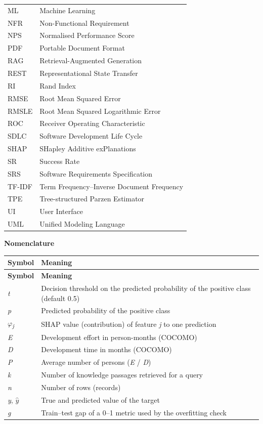 \begin{longtable}{@{}p{1.5in}p{\dimexpr\linewidth-1.5in-2\tabcolsep\relax}@{}}
ML & Machine Learning \\
NFR & Non-Functional Requirement \\
NPS & Normalised Performance Score \\
PDF & Portable Document Format \\
RAG & Retrieval-Augmented Generation \\
REST & Representational State Transfer \\
RI & Rand Index \\
RMSE & Root Mean Squared Error \\
RMSLE & Root Mean Squared Logarithmic Error \\
ROC & Receiver Operating Characteristic \\
SDLC & Software Development Life Cycle \\
SHAP & SHapley Additive exPlanations \\
SR & Success Rate \\
SRS & Software Requirements Specification \\
TF-IDF & Term Frequency--Inverse Document Frequency \\
TPE & Tree-structured Parzen Estimator \\
UI & User Interface \\
UML & Unified Modeling Language \\
\end{longtable}
\endgroup
\vspace{24pt}
{\centering\normalfont\bfseries\fontsize{20}{24}\selectfont Nomenclature\par}
\vspace{18pt}
\begingroup
\linespread{1}\selectfont\renewcommand{\arraystretch}{1.25}
\begin{longtable}{@{}p{1.5in}p{\dimexpr\linewidth-1.5in-2\tabcolsep\relax}@{}}
\textbf{Symbol} & \textbf{Meaning} \\[2pt]
\endfirsthead
\textbf{Symbol} & \textbf{Meaning} \\[2pt]
\endhead
\textit{t} & Decision threshold on the predicted probability of the positive class (default 0.5) \\
\textit{p} & Predicted probability of the positive class \\
\textit{\ensuremath{\varphi}}\textit{\textsubscript{j}} & SHAP value (contribution) of feature \textit{j} to one prediction \\
\textit{E} & Development effort in person-months (COCOMO) \\
\textit{D} & Development time in months (COCOMO) \\
\textit{P} & Average number of persons (\textit{E} / \textit{D}) \\
\textit{k} & Number of knowledge passages retrieved for a query \\
\textit{n} & Number of rows (records) \\
\textit{y}, \textit{\ensuremath{\hat{y}}} & True and predicted value of the target \\
\textit{g} & Train--test gap of a 0--1 metric used by the overfitting check \\
\end{longtable}
\endgroup

